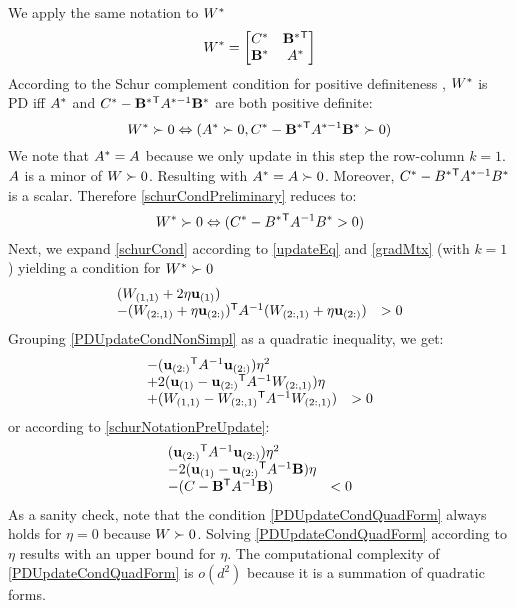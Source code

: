 \documentclass{article}
\begin{document}
We apply the same notation to ${{W^*}}$
\begin{equation}
{{{W^*}}}= \left[ \begin{matrix} C^* & \mathbf{B^*}{}^\mathsf{T} \\ \mathbf{B^*} & {A^*} \end{matrix} \right]
\end{equation}
According to the Schur complement condition for positive definiteness , ${{W^*}}$ is PD iff ${A}^*$ and $C^* - \mathbf{B}^*{}^\mathsf{T} {A}^{*-1} \mathbf{B}^*$ are both positive definite:
\begin{equation}
{{W^*}} \succ  0 \Leftrightarrow ({A}^* \succ  0, C^* - \mathbf{B}^*{}^\mathsf{T} {A}^{*-1} \mathbf{B}^* \succ  0)
\label{schurCondPreliminary}
\end{equation}
We note that ${A}^* = {A}$ because we only update in this step the row-column $k=1$. ${A}$ is a minor of ${W} \succ  0$. Resulting with ${A}^*={A} \succ  0$. Moreover, $C^* - B^*{}^\mathsf{T} A^{*-1} B^*$ is a scalar. Therefore \eqref{schurCondPreliminary} reduces to:
\begin{equation}
{W^*} \succ  0 \Leftrightarrow (C^* - B^*{}^\mathsf{T} A^{-1} B^* >  0)
\label{schurCond}
\end{equation}
Next, we expand \eqref{schurCond} according to \eqref{updateEq} and \eqref{gradMtx} (with $k=1$) yielding a condition for ${{W^*}} \succ  0$
\begin{equation}
\begin{array}{ll} 
({W}_{(1,1)} + 2\eta \mathbf{u}_{(1)})  \\
-({W}_{(2:,1)} + \eta \mathbf{u}_{(2:)}){}^\mathsf{T} {A}^{-1} ({W}_{(2:,1)} + \eta \mathbf{u}_{(2:)})  & > 0
\end{array}
\label{PDUpdateCondNonSimpl}
\end{equation}
Grouping \eqref{PDUpdateCondNonSimpl} as a quadratic inequality, we get:
\begin{equation}
\begin{array}{ll} 
-(\mathbf{u}_{(2:)}{}^\mathsf{T} {A}^{-1} \mathbf{u}_{(2:)})\eta^2 \\
+2(\mathbf{u}_{(1)} - \mathbf{u}_{(2:)}{}^\mathsf{T} {A}^{-1}{W}_{(2:,1)})\eta\\
+({W}_{(1,1)} - {W}_{(2:,1)}{}^\mathsf{T}  {A}^{-1} {W}_{(2:,1)}) & > 0
\end{array}
\label{PDUpdateCondQuadFormWithW}
\end{equation}
or according to \eqref{schurNotationPreUpdate}:
\begin{equation}
\begin{array}{ll} 
(\mathbf{u}_{(2:)}{}^\mathsf{T} {A}^{-1} \mathbf{u}_{(2:)}) \eta^2 \\
-2(\mathbf{u}_{(1)} - \mathbf{u}_{(2:)}{}^\mathsf{T} {A}^{-1}\mathbf{B})\eta \\
-(C - \mathbf{B}{}^\mathsf{T}  {A}^{-1} \mathbf{B}) & < 0
\end{array}
\label{PDUpdateCondQuadForm}
\end{equation}
As a sanity check, note that the condition \eqref{PDUpdateCondQuadForm} always holds for $\eta = 0$ because ${W}\succ0$. Solving \eqref{PDUpdateCondQuadForm} according to $\eta$ results with an upper bound for $\eta$.  The computational complexity of \eqref{PDUpdateCondQuadForm} is $o(d^2)$ because it is a summation of quadratic forms. 
\end{document}
